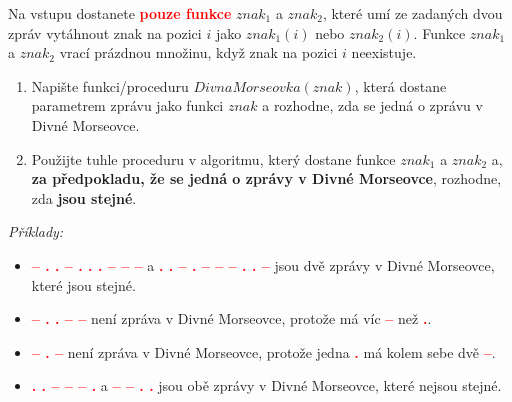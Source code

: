 \documentclass[a4paper,11pt]{article}
\newcommand{\clr}{\textcolor{red}}
\begin{document}
Na vstupu dostanete \clr{\textbf{pouze funkce}} $znak_1$ a $znak_2$, které umí
ze zadaných dvou zpráv vytáhnout znak na pozici $i$ jako $znak_1(i)$ nebo
$znak_2(i)$. Funkce $znak_1$ a $znak_2$ vrací prázdnou množinu, když znak na
pozici $i$ neexistuje.

\begin{enumerate}
 \item Napište funkci/proceduru $DivnaMorseovka(znak)$, která dostane parametrem
  zprávu jako funkci $znak$ a rozhodne, zda se jedná o zprávu v Divné Morseovce.
 \item Použijte tuhle proceduru v algoritmu, který dostane funkce $znak_1$ a
  $znak_2$ a, \textbf{za předpokladu, že se jedná o zprávy v Divné Morseovce},
  rozhodne, zda \textbf{jsou stejné}.
\end{enumerate}

\emph{Příklady:}
\begin{itemize}
 \item \clr{\textbf{-- . . -- . . . -- -- --}} a \clr{\textbf{. . -- . -- -- --
  . . --}} jsou dvě zprávy v Divné Morseovce, které jsou stejné.
 \item \clr{\textbf{-- . . -- --}} není zpráva v Divné Morseovce, protože má víc
  \clr{\textbf{--}} než \clr{\textbf{.}}.
 \item \clr{\textbf{-- . --}} není zpráva v Divné Morseovce, protože jedna
  \clr{\textbf{.}} má kolem sebe dvě \clr{\textbf{--}}.
 \item \clr{\textbf{. . -- -- -- .}} a \clr{\textbf{-- -- . .}} jsou obě zprávy
  v Divné Morseovce, které nejsou stejné.
\end{itemize}
\end{document}
